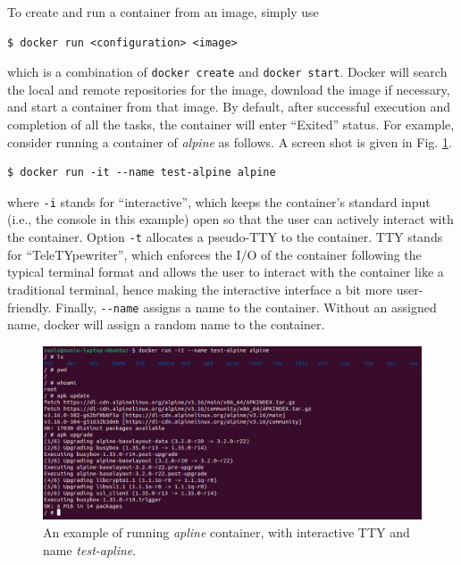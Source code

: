 To create and run a container from an image, simply use
\begin{lstlisting}
$ docker run <configuration> <image>
\end{lstlisting}
which is a combination of \verb|docker create| and \verb|docker start|. Docker will search the local and remote repositories for the image, download the image if necessary, and start a container from that image. By default, after successful execution and completion of all the tasks, the container will enter ``Exited'' status. For example, consider running a container of \textit{alpine} as follows. A screen shot is given in Fig. \ref{ch:vac:fig:dockerrunexp}.
\begin{lstlisting}
$ docker run -it --name test-alpine alpine
\end{lstlisting}
where \verb|-i| stands for ``interactive'', which keeps the container's standard input (i.e., the console in this example) open so that the user can actively interact with the container. Option \verb|-t| allocates a pseudo-TTY to the container. TTY stands for ``TeleTYpewriter'', which enforces the I/O of the container following the typical terminal format and allows the user to interact with the container like a traditional terminal, hence making the interactive interface a bit more user-friendly. Finally, \verb|--name| assigns a name to the container. Without an assigned name, docker will assign a random name to the container.
\begin{figure}
	\centering
	\includegraphics[width=350pt]{chapters/ch-virtualization-and-containerization/figures/dockerrunexp.png}
	\caption{An example of running \textit{apline} container, with interactive TTY and name \textit{test-apline}.} \label{ch:vac:fig:dockerrunexp}
\end{figure}

